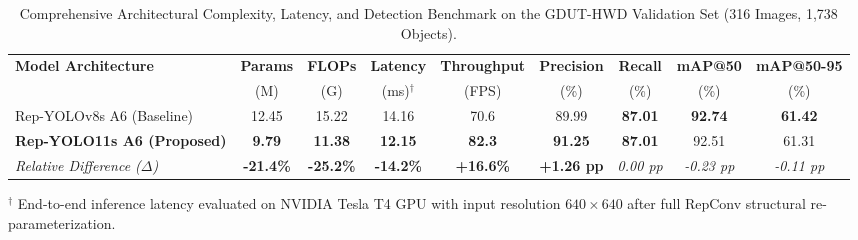\documentclass[conference]{IEEEtran}
\begin{document}
\begin{table}[t]
\centering
\caption{Comprehensive Architectural Complexity, Latency, and Detection Benchmark on the GDUT-HWD Validation Set (316 Images, 1,738 Objects).}
\label{tab:gdut_overall_benchmark}
\small
\begin{tabular*}{\textwidth}{@{\extracolsep{\fill}}lcccccccc@{}}
\toprule
\textbf{Model Architecture} & \textbf{Params} & \textbf{FLOPs} & \textbf{Latency} & \textbf{Throughput} & \textbf{Precision} & \textbf{Recall} & \textbf{mAP@50} & \textbf{mAP@50-95} \\
 & (M) & (G) & (ms)$^{\dagger}$ & (FPS) & (\%) & (\%) & (\%) & (\%) \\
\midrule
Rep-YOLOv8s A6 (Baseline) & 12.45 & 15.22 & 14.16 & 70.6 & 89.99 & \textbf{87.01} & \textbf{92.74} & \textbf{61.42} \\
\textbf{Rep-YOLO11s A6 (Proposed)} & \textbf{9.79} & \textbf{11.38} & \textbf{12.15} & \textbf{82.3} & \textbf{91.25} & \textbf{87.01} & 92.51 & 61.31 \\
\midrule
\textit{Relative Difference ($\Delta$)} & \textbf{-21.4\%} & \textbf{-25.2\%} & \textbf{-14.2\%} & \textbf{+16.6\%} & \textbf{+1.26 pp} & \textit{0.00 pp} & \textit{-0.23 pp} & \textit{-0.11 pp} \\
\bottomrule
\end{tabular*}
\begin{flushleft}
\footnotesize $^{\dagger}$ End-to-end inference latency evaluated on NVIDIA Tesla T4 GPU with input resolution $640 \times 640$ after full RepConv structural re-parameterization.
\end{flushleft}
\end{table}
\end{document}
